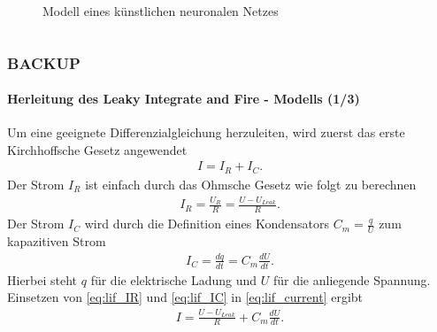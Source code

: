 \documentclass[10pt,t,aspectratio=1610]{beamer}
\newcommand{\ChapterBackup}{BACKUP}
\begin{document}
\begin{frame}[c]
\begin{columns}[T,onlytextwidth]
\begin{column}{0.5\textwidth}
\begin{figure}[H]
			\caption{Modell eines künstlichen neuronalen Netzes}
			\label{fig:model_knn}
		\end{figure}
	\end{column}
\end{columns}
\end{frame}


\begin{frame}

	\frametitle{\ChapterBackup}
	\framesubtitle{Herleitung des Leaky Integrate and Fire - Modells (1/3)}
	\vspace{0.3cm}
	Um eine geeignete Differenzialgleichung herzuleiten, wird zuerst das erste Kirchhoffsche Gesetz angewendet
	\begin{align}
	\label{eq:lif_current}
	I = I_R + I_C\text{.}
	\end{align}
	Der Strom $I_R$ ist einfach durch das Ohmsche Gesetz wie folgt zu berechnen
	\begin{align}
	\label{eq:lif_IR}
	I_R = \frac{U_R}{R} = \frac{U - U_{Leak}}{R}\text{.}
	\end{align}
	Der Strom $I_C$ wird durch die Definition eines Kondensators $C_m = \tfrac{q}{U}$ zum kapazitiven Strom 
	\begin{align}
	\label{eq:lif_IC}
	I_C = \frac{dq}{dt} = C_m \frac{dU}{dt}\text{.}
	\end{align}
	Hierbei steht $q$ für die elektrische Ladung und $U$ für die anliegende Spannung.\\
	Einsetzen von \eqref{eq:lif_IR} und \eqref{eq:lif_IC} in \eqref{eq:lif_current} ergibt
	\begin{align}
	\label{eq:lif_I}
	I = \frac{U - U_{Leak}}{R} + C_m\frac{dU}{dt}\text{.}
	\end{align}
\end{frame}

\end{document}
